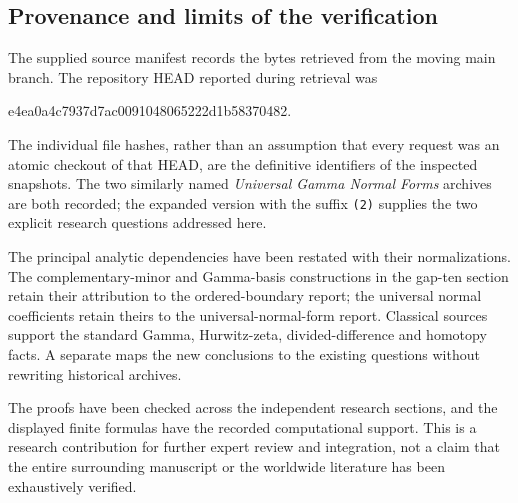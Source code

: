 \subsection{Provenance and limits of the verification}

The supplied source manifest records the bytes retrieved from the
moving main branch. The repository HEAD reported during retrieval was
\begin{center}\small\ttfamily
e4ea0a4c7937d7ac0091048065222d1b58370482.
\end{center}
The individual file hashes, rather than an assumption that every
request was an atomic checkout of that HEAD, are the definitive
identifiers of the inspected snapshots. The two similarly named
\emph{Universal Gamma Normal Forms} archives are both recorded;
the expanded version with the suffix \texttt{(2)} supplies the
two explicit research questions addressed here.

The principal analytic dependencies have been restated with their
normalizations. The complementary-minor and Gamma-basis constructions
in the gap-ten section retain their attribution to the ordered-boundary
report; the universal normal coefficients retain theirs to the
universal-normal-form report. Classical sources support the standard
Gamma, Hurwitz-zeta, divided-difference and homotopy facts. A separate
 maps the new conclusions to the existing
questions without rewriting historical archives.

The proofs have been checked across the independent research sections,
and the displayed finite formulas have the recorded computational
support. This is a research contribution for further expert review
and integration, not a claim that the entire surrounding manuscript
or the worldwide literature has been exhaustively verified.
